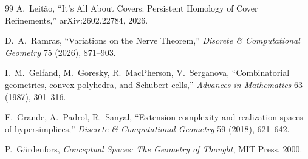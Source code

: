\documentclass[11pt]{article}
\begin{document}
\begin{thebibliography}{99}
A.~Leit\~ao,
``It's All About Covers: Persistent Homology of Cover Refinements,''
arXiv:2602.22784, 2026.

D.~A.~Ramras,
``Variations on the Nerve Theorem,''
\emph{Discrete \& Computational Geometry} 75 (2026), 871--903.

I.~M.~Gelfand, M.~Goresky, R.~MacPherson, V.~Serganova,
``Combinatorial geometries, convex polyhedra, and Schubert cells,''
\emph{Advances in Mathematics} 63 (1987), 301--316.

F.~Grande, A.~Padrol, R.~Sanyal,
``Extension complexity and realization spaces of hypersimplices,''
\emph{Discrete \& Computational Geometry} 59 (2018), 621--642.

P.~G\"ardenfors,
\emph{Conceptual Spaces: The Geometry of Thought},
MIT Press, 2000.

\end{thebibliography}
\end{document}
